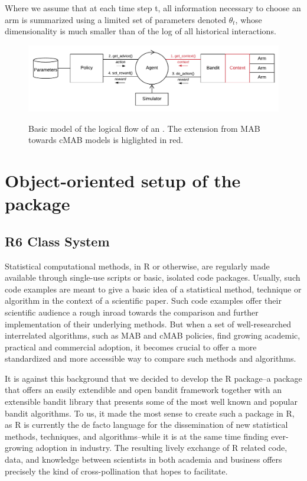\documentclass[nojss]{jss}\usepackage[]{graphicx}\usepackage[]{color}
\begin{document}
Where we assume that at each time step t, all information necessary to choose an arm is summarized using a limited set of parameters denoted $\theta_t$, whose dimensionality is much smaller than of the log of all historical interactions.

\begin{figure}[H]
  \centering
    \includegraphics[width=.99\textwidth]{fig/cmab_chart}
    \label{fig:cmab_chart}
      \caption{Basic model of the logical flow of an . The extension from MAB towards cMAB models is higlighted in red. }
\end{figure}











\section{Object-oriented setup of the package}

\subsection{R6 Class System}


Statistical computational methods, in R or otherwise,  are regularly made available through single-use scripts or basic, isolated code packages. Usually, such code examples are meant to give a basic idea of a statistical method, technique or algorithm in the context of a scientific paper.  Such code examples offer their scientific audience a rough inroad towards the comparison and further implementation of their underlying methods. But when a set of well-researched interrelated algorithms, such as MAB and cMAB policies, find growing academic, practical and commercial adoption, it becomes crucial to offer a more standardized and more accessible way to compare such methods and algorithms.

It is against this background that we decided to develop the  R package--a package that offers an easily extendible and open bandit framework together with an extensible bandit library that presents some of the most well known and popular bandit algorithms. To us, it made the most sense to create such a package in R, as R is currently the de facto language for the dissemination of new statistical methods, techniques, and algorithms--while it is at the same time finding ever-growing adoption in industry. The resulting lively exchange of R related code, data, and knowledge between scientists in both academia and business offers precisely the kind of cross-pollination that  hopes to facilitate.
\end{document}
